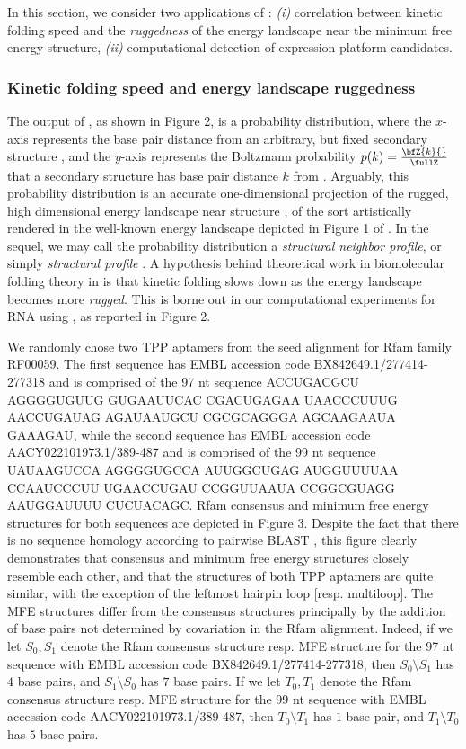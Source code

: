 In this section, we consider two applications of \fftbor:
{\em (i)} correlation between kinetic folding speed and the {\em ruggedness}
of the energy landscape near the minimum free energy structure,
{\em (ii)} computational detection of \rb
expression platform candidates.

\subsubsection*{Kinetic folding speed and energy landscape ruggedness}

The output of \fftbor, as shown in
Figure 2, is a probability distribution,
where the $x$-axis represents the base pair distance from an arbitrary,
but fixed secondary structure \strSt, and the $y$-axis represents the
Boltzmann probability $p(k) = \frac{\bfZ{k}{}}{\fullZ}$ that a secondary structure
has base pair distance $k$ from \strSt. Arguably, this probability distribution
is an accurate one-dimensional projection of the rugged, high dimensional energy
landscape near structure \strSt,
of the sort artistically rendered in the well-known
energy landscape depicted in Figure 1  of \citep{Wolynes.ptam05}.
In the sequel, we may call the \fftbor probability distribution a
{\em structural neighbor profile}, or simply {\em structural profile}
\strSt.
A hypothesis behind theoretical work in biomolecular folding theory in
\citep{Bryngelson.p95}
is that kinetic folding slows down as the energy landscape becomes more
{\em rugged}. This is borne out in our computational experiments for RNA
using \fftbor, as reported
in Figure 2.

We randomly chose two TPP \rb
aptamers from the seed alignment for
Rfam family RF00059. The first sequence has EMBL accession code
BX842649.1/277414-277318 and is comprised of the 97 nt sequence
ACCUGACGCU AGGGGUGUUG GUGAAUUCAC CGACUGAGAA UAACCCUUUG AACCUGAUAG
AGAUAAUGCU CGCGCAGGGA AGCAAGAAUA GAAAGAU, while the second sequence
has EMBL accession code AACY022101973.1/389-487 and is comprised of the 99
nt sequence
UAUAAGUCCA AGGGGUGCCA AUUGGCUGAG AUGGUUUUAA CCAAUCCCUU
UGAACCUGAU CCGGUUAAUA CCGGCGUAGG AAUGGAUUUU CUCUACAGC.
Rfam consensus and minimum free energy structures for both sequences are
depicted in Figure 3.
Despite the fact that there is no sequence homology according to
pairwise BLAST \citep{BLAST}, this figure clearly demonstrates that
consensus and
minimum free energy structures closely resemble each other, and that the
structures of both TPP \rb aptamers are quite similar, with the
exception of the leftmost hairpin loop [resp. multiloop].
The MFE structures differ
from the consensus structures principally by the addition of base pairs not
determined by covariation in the Rfam alignment.
Indeed, if we let $S_0,S_1$
denote the Rfam consensus structure resp. MFE structure for the 97 nt
sequence with EMBL accession code BX842649.1/277414-277318, then
$S_0 \setminus S_1$ has $4$ base pairs, and $S_1\setminus S_0$ has $7$
base pairs. If we let $T_0,T_1$
denote the Rfam consensus structure resp. MFE structure for the 99 nt
sequence with EMBL accession code
AACY022101973.1/389-487, then
$T_0 \setminus T_1$ has $1$ base pair, and $T_1\setminus T_0$ has $5$
base pairs.

